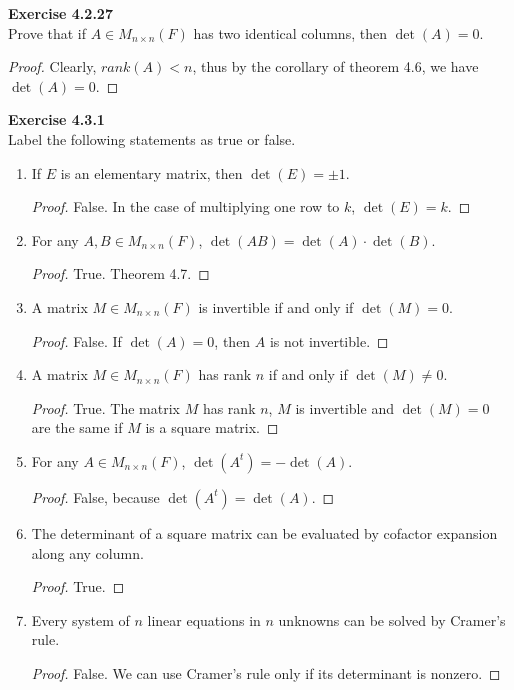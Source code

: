 \documentclass[12pt, a4paper]{article}
\theoremstyle{plain}
\newenvironment{exercise}[2][Exercise]
    { \begin{mdframed}[backgroundcolor=gray!20] \textbf{#1 #2} \\}
    {  \end{mdframed}}
\begin{document}
\begin{exercise}{4.2.27}
Prove that if $A\in M_{n\times n}(F)$ has two identical columns, then $\det(A)=0$.
\end{exercise}
	\begin{proof}
	Clearly, $rank(A)<n$, thus by the corollary of theorem 4.6, we have $\det (A)=0$.
	\end{proof}

\pagebreak
	
\begin{exercise}{4.3.1}
Label the following statements as true or false.
	\begin{enumerate}[label=(\roman*)]
	\item If $E$ is an elementary matrix, then $\det(E)=\pm 1$.
	\begin{proof}
	False. In the case of multiplying one row to $k$, $\det(E)=k$.
	\end{proof}
	\item For any $A,B\in M_{n\times n}(F)$, $\det(AB)=\det(A)\cdot \det(B)$.
	\begin{proof}
	True. Theorem 4.7.
	\end{proof}
	\item A matrix $M\in M_{n\times n}(F)$ is invertible if and only if $\det(M)=0$.
	\begin{proof}
	False. If $\det(A)=0$, then $A$ is not invertible.
	\end{proof}
	\item A matrix $M\in M_{n\times n}(F)$ has rank $n$ if and only if $\det(M)\neq 0$.
	\begin{proof}
	True. The matrix $M$ has rank $n$, $M$ is invertible and $\det(M)=0$ are the same if $M$ is a square matrix.
	\end{proof}
	\item For any $A\in M_{n\times n}(F)$, $\det(A^t)=-\det(A)$.
	\begin{proof}
	False, because $\det(A^t)=\det(A)$.
	\end{proof}
	\item The determinant of a square matrix can be evaluated by cofactor expansion along any column.
	\begin{proof}
	True.
	\end{proof}
	\item Every system of $n$ linear equations in $n$ unknowns can be solved by Cramer's rule.
	\begin{proof}
	False. We can use Cramer's rule only if its determinant is nonzero.
	\end{proof}

\end{enumerate}
\end{exercise}
\end{document}
